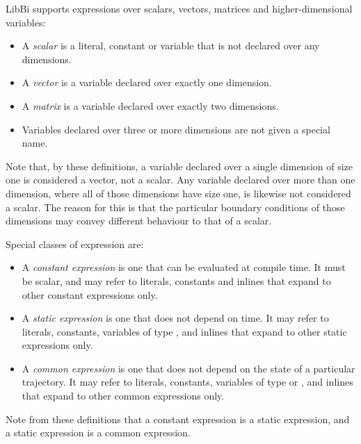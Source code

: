 LibBi supports expressions over scalars, vectors, matrices and
higher-dimensional variables:
\begin{itemize}
\item A \textit{scalar} is a literal, constant or variable that
  is not declared over any dimensions.
\item A \textit{vector} is a variable declared over
  exactly one dimension.
\item A \textit{matrix} is a variable declared over exactly two
  dimensions.
\item Variables declared over three or more dimensions are not given a special
  name.
\end{itemize}
Note that, by these definitions, a variable declared over a single dimension
of size one is considered a vector, not a scalar. Any variable declared over
more than one dimension, where all of those dimensions have size one, is
likewise not considered a scalar. The reason for this is that the particular
boundary conditions of those dimensions may convey different behaviour to that
of a scalar.

Special classes of expression are:
\begin{itemize}
\item A \textit{constant expression} is one that
  can be evaluated at compile time. It must be scalar, and may refer to
  literals, constants and inlines that expand to other constant expressions
  only.
\item A \textit{static expression} is one that does
  not depend on time. It may refer to literals, constants, variables of type
  , and inlines that expand to other static expressions only.
\item A \textit{common expression} is one that does
  not depend on the state of a particular trajectory. It may refer to
  literals, constants, variables of type  or , and
  inlines that expand to other common expressions only.
\end{itemize}
Note from these definitions that a constant expression is a static expression,
and a static expression is a common expression.


